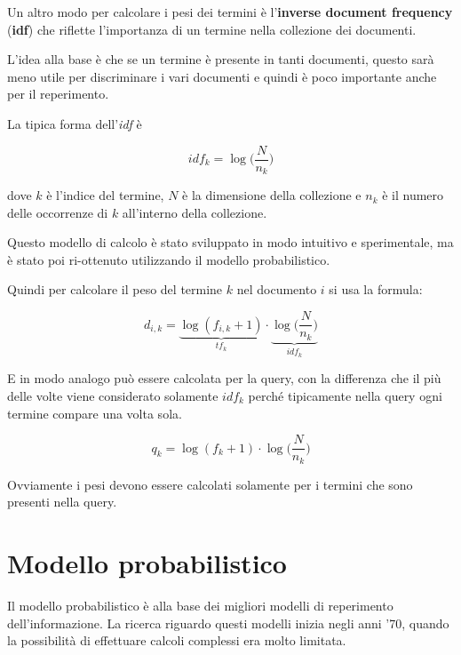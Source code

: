 

Un altro modo per calcolare i pesi dei termini è l'\textbf{inverse document frequency} (\textbf{idf}) che riflette l'importanza di un termine nella collezione dei documenti.

L'idea alla base è che se un termine è presente in tanti documenti, questo sarà meno utile per discriminare i vari documenti e quindi è poco importante anche per il reperimento.

La tipica forma dell'\textit{idf} è

$$
idf_k = \log\bigg(\frac{N}{n_k}\bigg)
$$

\noindent dove $k$ è l'indice del termine, $N$ è la dimensione della collezione e $n_k$ è il numero delle occorrenze di $k$ all'interno della collezione.

Questo modello di calcolo è stato sviluppato in modo intuitivo e sperimentale, ma è stato poi ri-ottenuto utilizzando il modello probabilistico.

Quindi per calcolare il peso del termine $k$ nel documento $i$ si usa la formula:

$$
d_{i,k} = \underbrace{\log (f_{i,k} +1 )}_{tf_k} \cdot \underbrace{\log\bigg(\frac{N}{n_k}\bigg)}_{idf_k}
$$

\noindent E in modo analogo può essere calcolata per la query, con la differenza che il più delle volte viene considerato solamente $idf_k$ perché tipicamente nella query ogni termine compare una volta sola.

$$
q_k = \log(f_k +1 )\cdot \log \bigg(\frac{N}{n_k}\bigg)
$$

\noindent Ovviamente i pesi devono essere calcolati solamente per i termini che sono presenti nella query.

\section{Modello probabilistico}

Il modello probabilistico è alla base dei migliori modelli di reperimento dell'informazione.
La ricerca riguardo questi modelli inizia negli anni '70, quando la possibilità di effettuare calcoli complessi era molto limitata.

